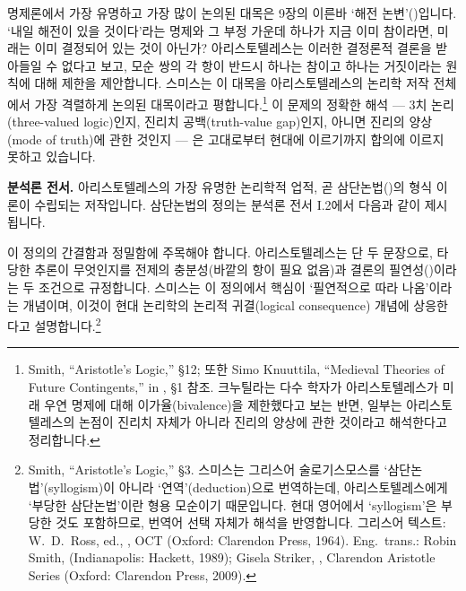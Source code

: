 \documentclass[12pt, a4paper]{article}
\begin{document}
명제론에서 가장 유명하고 가장 많이 논의된 대목은 9장의 이른바 `해전 논변'()입니다. `내일 해전이 있을 것이다'라는 명제와 그 부정 가운데 하나가 지금 이미 참이라면, 미래는 이미 결정되어 있는 것이 아닌가? 아리스토텔레스는 이러한 결정론적 결론을 받아들일 수 없다고 보고, 모순 쌍의 각 항이 반드시 하나는 참이고 하나는 거짓이라는 원칙에 대해 제한을 제안합니다. 스미스는 이 대목을 아리스토텔레스의 논리학 저작 전체에서 가장 격렬하게 논의된 대목이라고 평합니다.\footnote{Smith, ``Aristotle's Logic,'' §12; 또한 Simo Knuuttila, ``Medieval Theories of Future Contingents,'' in , §1 참조. 크누틸라는 다수 학자가 아리스토텔레스가 미래 우연 명제에 대해 이가율(bivalence)을 제한했다고 보는 반면, 일부는 아리스토텔레스의 논점이 진리치 자체가 아니라 진리의 양상에 관한 것이라고 해석한다고 정리합니다.} 이 문제의 정확한 해석 --- 3치 논리(three-valued logic)인지, 진리치 공백(truth-value gap)인지, 아니면 진리의 양상(mode of truth)에 관한 것인지 --- 은 고대로부터 현대에 이르기까지 합의에 이르지 못하고 있습니다.

\textbf{분석론 전서.} 아리스토텔레스의 가장 유명한 논리학적 업적, 곧 삼단논법()의 형식 이론이 수립되는 저작입니다. 삼단논법의 정의는 분석론 전서 I.2에서 다음과 같이 제시됩니다.


이 정의의 간결함과 정밀함에 주목해야 합니다. 아리스토텔레스는 단 두 문장으로, 타당한 추론이 무엇인지를 전제의 충분성(바깥의 항이 필요 없음)과 결론의 필연성()이라는 두 조건으로 규정합니다. 스미스는 이 정의에서 핵심이 `필연적으로 따라 나옴'이라는 개념이며, 이것이 현대 논리학의 논리적 귀결(logical consequence) 개념에 상응한다고 설명합니다.\footnote{Smith, ``Aristotle's Logic,'' §3. 스미스는 그리스어 술로기스모스를 `삼단논법'(syllogism)이 아니라 `연역'(deduction)으로 번역하는데, 아리스토텔레스에게 `부당한 삼단논법'이란 형용 모순이기 때문입니다. 현대 영어에서 `syllogism'은 부당한 것도 포함하므로, 번역어 선택 자체가 해석을 반영합니다. 그리스어 텍스트: W.\ D.\ Ross, ed., , OCT (Oxford: Clarendon Press, 1964). Eng.\ trans.: Robin Smith,  (Indianapolis: Hackett, 1989); Gisela Striker, , Clarendon Aristotle Series (Oxford: Clarendon Press, 2009).}
\end{document}
